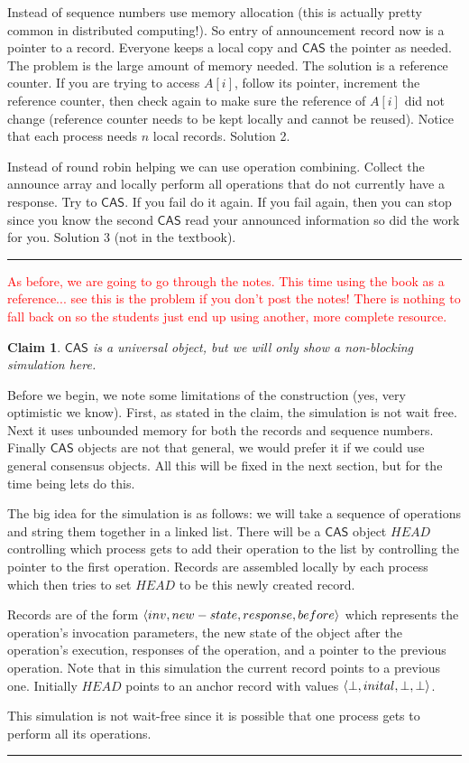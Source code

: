 \documentclass[twoside]{article}
\newtheorem{claim}[theorem]{Claim}
\newenvironment{proof}{{\bf Proof:}}{\hfill\rule{2mm}{2mm}}
\newcommand\CAS{\mathsf{CAS}}
\DeclarePairedDelimiter\anglebrac{\langle}{\rangle}
\begin{document}
\begin{proof}
Instead of sequence numbers use memory allocation (this is actually pretty common in distributed computing!). So entry of announcement record now is a pointer to a record. Everyone keeps a local copy and $\CAS$ the pointer as needed. The problem is the large amount of memory needed. The solution is a reference counter. If you are trying to access $A[i]$, follow its pointer, increment the reference counter, then check again to make sure the reference of $A[i]$ did not change (reference counter needs to be kept locally and cannot be reused). Notice that each process needs $n$ local records. Solution 2.

Instead of round robin helping we can use operation combining. Collect the announce array and locally perform all operations that do not currently have a response. Try to $\CAS$. If you fail do it again. If you fail again, then you can stop since you know the second $\CAS$ read your announced information so did the work for you. Solution 3 (not in the textbook).
\end{proof}

\textcolor{red}{As before, we are going to go through the notes. This time using the book as a reference... see this is the problem if you don't post the notes! There is nothing to fall back on so the students just end up using another, more complete resource.}

\begin{claim}
$\CAS$ is a universal object, but we will only show a non-blocking simulation here. 
\end{claim}
\begin{proof}
Before we begin, we note some limitations of the construction (yes, very optimistic we know). First, as stated in the claim, the simulation is not wait free. Next it uses unbounded memory for both the records and sequence numbers. Finally $\CAS$ objects are not that general, we would prefer it if we could use general consensus objects. All this will be fixed in the next section, but for the time being lets do this.

The big idea for the simulation is as follows: we will take a sequence of operations and string them together in a linked list. There will be a $\CAS$ object $HEAD$ controlling which process gets to add their operation to the list by controlling the pointer to the first operation. Records are assembled locally by each process which then tries to set $HEAD$ to be this newly created record. 

Records are of the form $\anglebrac{inv, new-state, response, before}$ which represents the operation's invocation parameters, the new state of the object after the operation's execution, responses of the operation, and a pointer to the previous operation. Note that in this simulation the current record points to a previous one. Initially $HEAD$ points to an anchor record with values $\anglebrac{\bot, inital, \bot, \bot}$.

This simulation is not wait-free since it is possible that one process gets to perform all its operations. 
\end{proof}
\end{document}
